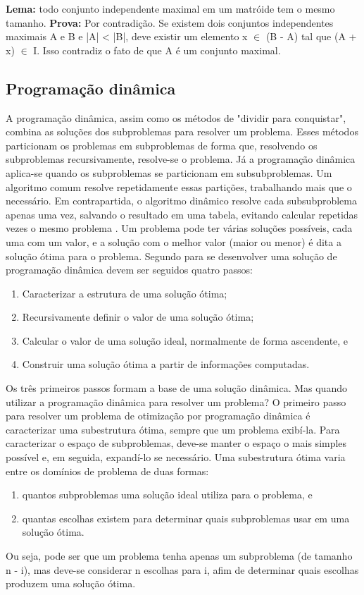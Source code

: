 \textbf{Lema:} todo conjunto independente maximal em um matróide tem o mesmo tamanho. 
\textbf{Prova:}  Por contradição. Se existem dois conjuntos independentes maximais A e B e |A| < |B|, deve existir um elemento x $\in$ (B - A) tal que (A + x) $\in$ I. Isso contradiz o fato de que A é um conjunto maximal.

\subsection{Programação dinâmica} \label{Programação dinâmica}
A programação dinâmica, assim como os métodos de "dividir para conquistar", combina as soluções dos subproblemas para resolver um problema. Esses métodos particionam os problemas em subproblemas de forma que, resolvendo os subproblemas recursivamente, resolve-se o problema. Já a programação dinâmica aplica-se quando os subproblemas se particionam em subsubproblemas. Um algoritmo comum resolve repetidamente essas partições, trabalhando mais que o necessário. Em contrapartida, o algoritmo dinâmico resolve cada subsubproblema apenas uma vez, salvando o resultado em uma tabela, evitando calcular repetidas vezes o mesmo problema \cite{cormen2009introduction}.
Um problema pode ter várias soluções possíveis, cada uma com um valor, e a solução com o melhor valor (maior ou menor) é dita a solução ótima para o problema.
Segundo \cite{cormen2009introduction} para se desenvolver uma solução de programação dinâmica devem ser seguidos quatro passos:
\begin{enumerate}
\item Caracterizar a estrutura de uma solução ótima;
\item Recursivamente definir o valor de uma solução ótima;
\item Calcular o valor de uma solução ideal, normalmente de forma ascendente, e
\item Construir uma solução ótima a partir de informações computadas. 
\end{enumerate}
Os três primeiros passos formam a base de uma solução dinâmica. Mas quando utilizar a programação dinâmica para resolver um problema? O primeiro passo para resolver um problema de otimização por programação dinâmica é caracterizar uma subestrutura ótima, sempre que um problema exibí-la. 
Para caracterizar o espaço de subproblemas, deve-se manter o espaço o mais simples possível e, em seguida, expandí-lo se necessário. Uma subestrutura ótima varia entre os domínios de problema de duas formas:
\begin{enumerate}[label=(\roman*)]
\item quantos subproblemas uma solução ideal utiliza para o problema, e
\item quantas escolhas existem para determinar quais subproblemas usar em uma solução ótima.
\end{enumerate}
Ou seja, pode ser que um problema tenha apenas um subproblema (de tamanho n - i), mas deve-se considerar n escolhas para i, afim de determinar quais escolhas produzem uma solução ótima.

